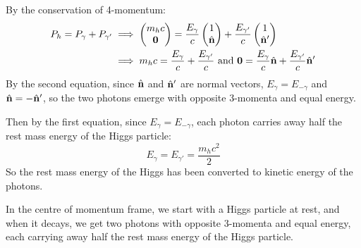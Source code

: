 \documentclass[../main.tex]{subfiles}
\begin{document}
By the conservation of 4-momentum:
\begin{align*}
  P_h = P_\gamma + P_{\gamma'} &\implies \begin{pmatrix}
  m_h c \\
  \mathbf{\bm{0}} \\
  \end{pmatrix} = \frac{E_{\gamma}}{c}\begin{pmatrix}
  1 \\
  \hat{\mathbf{\bm{n}}} \\
  \end{pmatrix} + \frac{E_{\gamma'}}{c}\begin{pmatrix}
  1 \\
  \hat{\mathbf{\bm{n}}}' \\
  \end{pmatrix} \\
  &\implies m_h c = \frac{E_{\gamma}}{c} + \frac{E_{\gamma'}}{c} \text{ and } \mathbf{\bm{0}} = \frac{E_{\gamma}}{c}\hat{\mathbf{\bm{n}}} + \frac{E_{\gamma'}}{c}\hat{\mathbf{\bm{n}}}'
\end{align*}
By the second equation, since $\hat{\mathbf{\bm{n}}}$ and $\hat{\mathbf{\bm{n}}}'$ are normal vectors, $E_{\gamma} = E_{-\gamma}$ and $\hat{\mathbf{\bm{n}}} = -\hat{\mathbf{\bm{n}}}'$, so the two photons emerge with opposite 3-momenta and equal energy.
\begin{center}
\end{center}
Then by the first equation, since $E_{\gamma} = E_{-\gamma}$, each photon carries away half the rest mass energy of the Higgs particle:
\[
  E_{\gamma} = E_{\gamma'} = \frac{m_hc^2}{2}
\]
So the rest mass energy of the Higgs has been converted to kinetic energy of the photons.
\begin{remark}[Summary]
  In the centre of momentum frame, we start with a Higgs particle at rest, and when it decays, we get two photons with opposite 3-momenta and equal energy, each carrying away half the rest mass energy of the Higgs particle.
\end{remark}
\end{document}
